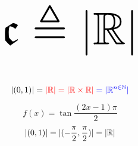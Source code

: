 
%
%
%
%
%

\begin{frame}{}
  \[
    \scalebox{5.5}{$\mathfrak{c} \triangleq |\R|$}
  \]

  \pause
  \vspace{0.50cm}
  \begin{center}
     \\[8pt]
  \end{center}
\end{frame}

\begin{frame}{}
  \begin{theorem}[$|\R|$ (Cantor 1877)]
    \[
      |(0,1)| = \textcolor{red}{|\mathbb{R}| = |\mathbb{R} \times \mathbb{R}|} \textcolor{blue}{\;= |\mathbb{R}^{n \in \mathbb{N}}|}
    \]
  \end{theorem}

  \pause
  \vspace{0.50cm}
  \[
    f(x) = \tan \frac{(2x-1)\pi}{2}
  \]
  \[
    |(0,1)| = |(-\frac{\pi}{2}, \frac{\pi}{2})| = |\mathbb{R}|
  \]
\end{frame}

